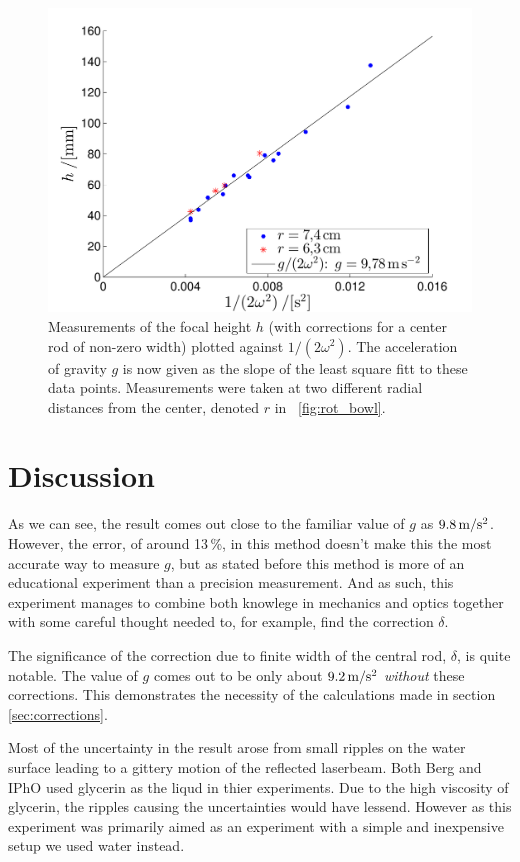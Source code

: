 \documentclass[11pt,towcolumn, swedish, english]{article}
\newcommand{\figref}{\figurename~\ref}
\begin{document}
\begin{figure}\centering 
\includegraphics[width=.65\linewidth]{g_minsta_kvadrat.pdf}
\caption{\label{fig:data} Measurements of the focal height $h$ (with
  corrections for a center rod of non-zero width) plotted against
  $1/(2\omega^2)$. The acceleration of gravity $g$ is now given as the
  slope of the least square fitt to these data points. Measurements
  were taken at two different radial distances from the center,
  denoted $r$ in \figref{fig:rot_bowl}.
}
\end{figure}


\section{Discussion}
As we can see, the result comes out close to the familiar value of $g$
as $\unit[9.8]{m/s^2}$. However, the error, of around 13\,\%, in this
method doesn't make this the most accurate way to measure $g$, but as
stated before this method is more of an educational experiment than a
precision measurement. And as such, this experiment manages to combine
both knowlege in mechanics and optics together with some careful
thought needed to, for example, find the correction $\delta$.

The significance of the correction due to finite width of the central
rod, $\delta$, is quite notable. The value of $g$ comes out to be only
about $\unit[9.2]{m/s^2}$ \emph{without} these corrections. This
demonstrates the necessity of the calculations made in section
\ref{sec:corrections}. 

Most of the uncertainty in the result arose from small ripples on the
water surface leading to a gittery motion of the reflected
laserbeam. Both Berg\cite{Berg1990} and IPhO\cite{IPhO2001} used
glycerin as the liqud in thier experiments. Due to the high viscosity
of glycerin, the ripples causing the uncertainties would have lessend.
However as this experiment was primarily aimed as an experiment with a
simple and inexpensive setup we used water instead.  
\end{document}
